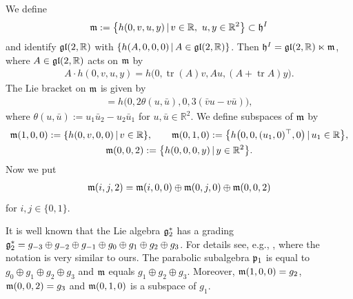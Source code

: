 \documentclass[11pt]{article}
\numberwithin{equation}{section}
\newcommand\fg{{\frak{g}}}
\newcommand\fh{{\frak h}}
\newcommand\fm{{\frak m}}
\newcommand\fp{{\frak p}}
\newcommand{\fgl}{\mathop{{\frak g \frak l}}}
\newcommand\RR{{\mathbb R}}
\newcommand{\tr}{\operatorname{tr}}
\begin{document}
We define
\begin{gather*} \fm:=\big\{h(0,v,u,y)\,|\, v\in\RR,\ u, y \in\RR^2\big\}\subset \fh^I\end{gather*}
and identify $\fgl(2,\RR)$ with $\{h(A,0,0,0)\,|\, A\in \fgl(2,\RR)\}$. Then $\fh^I=\fgl(2,\RR)\ltimes \fm$, where $A\in\fgl(2,\RR)$ acts on $\fm$ by
\begin{gather*}
A\cdot h(0,v,u,y)= h\big(0,\tr(A)v,Au,(A+\tr A)y\big).
\end{gather*}
The Lie bracket on $\fm$ is given by
\begin{gather*}
[h(0,v,u,y),h(0,\bar v,\bar u,\bar y)]=h\big(0,2\theta(u,\bar u),0,3(\bar v u-v\bar u)\big),
\end{gather*}
where $\theta(u,\bar u):=u_1\bar u_2-u_2\bar u_1$ for $u,\bar u\in\RR^2$. We define subspaces of $\fm$ by
\begin{gather*}
\fm(1,0,0):= \{h(0,v,0,0)\,|\, v\in\RR\},\qquad
\fm(0,1,0):= \big\{h\big(0,0,(u_1,0)^\top, 0\big)\,|\, u_1\in\RR\big\},\\
\fm(0,0,2):= \big\{h(0,0,0, y)\,|\, y\in\RR^2\big\}.
\end{gather*}
Now we put
\begin{gather*}\fm(i,j,2)= \fm(i,0,0)\oplus\fm(0,j,0)\oplus \fm(0,0,2)\end{gather*}
for $i,j\in\{0,1\}$.

\begin{Remark}
It is well known that the Lie algebra $\fg_2^*$ has a grading $\fg_2^*=g_{-3}\oplus g_{-2}\oplus g_{-1}\oplus g_0 \oplus g_{1}\oplus g_2\oplus g_3$. For details see, e.g., \cite[p.~14]{HS}, where the notation is very similar to ours. The parabolic subalgebra $\fp_1$ is equal to $g_0 \oplus g_{1}\oplus g_2\oplus g_3$ and $\fm$ equals $g_{1}\oplus g_2\oplus g_3$. Moreover, $\fm(1,0,0)=g_2$, $\fm(0,0,2)=g_3$ and $\fm(0,1,0)$ is a subspace of $g_1$.
\end{Remark}
\end{document}
